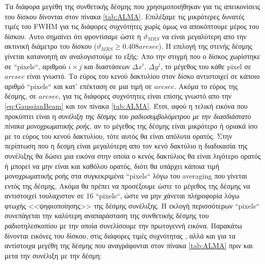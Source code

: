 Τα διάφορα μεγέθη της συνθετικής δέσμης που χρησιμοποιήθηκαν για τις απεικονίσεις του δίσκου δίνονται στον πίνακα \ref{tab:ALMA}. Επιλέξαμε τις μικρότερες δυνατές τιμές του {\en FWHM} για τις διάφορες συχνότητες χωρίς όμως να αποκόπτουμε μέρος του δίσκου. Αυτο σημαίνει ότι φροντίσαμε ώστε η $\vartheta_{MRS}$ να είναι μεγαλύτερη απο την ακτινική διάμετρο του δίσκου ($\vartheta_{MRS}\geq0.408 arcsec$). Η επιλογή της στενής δέσμης γίνεται κατανοητή αν αναλογιστούμε το εξής: Απο την στιγμή που ο δίσκος χωρίστηκε σε {\en ``pixels``}, αριθμού $i \times j$ και διαστάσεων $\Delta x^i$, $\Delta y^j$, το μέγεθος του κάθε {\en pixel} σε $arcsec$ είναι γνωστό. Το εύρος του κενού δακτυλίου στον δίσκο αντιστοιχεί σε κάποιο αριθμό {\en ``pixels``} και κατ' επέκταση σε μια τιμή σε $arcsec$. Ακόμα το εύρος της δέσμης, σε $arcsec$, για τις διάφορες συχνότητες είναι επίσης γνωστό απο την \eqref{eq:GaussianBeam} και τον πίνακα \ref{tab:ALMA}. Έτσι, αφού η τελική εικόνα που προκύπτει είναι η {\it συνέλιξη της δέσμης του ραδιοσυμβολόμετρου με την διασδιάστατο πίνακα μονοχρωματικής ροής}, αν το μέγεθος της δέσμης είναι μικρότερο ή οριακά ίσο με το εύρος του κενού δακτυλίου, τότε αυτός θα είναι απόλυτα ορατός. Στην περίπτωση που η δεσμη είναι μεγαλύτερη απο τον κενό δακτύλιο η διαδικασία της συνέλιξης θα δώσει μια εικόνα στην οποία ο κενός δακτύλιος θα είναι λιγότερο ορατός ή μπορεί να μην είναι και καθόλου ορατός, διότι θα υπάρχει κάποια τιμή μονοχρωματικής ροής στα συγκεκριμένα {\en ``pixels``} λόγω του {\en averaging} που γίνεται εντός της δέσμης. Ακόμα θα πρέπει να προσέξουμε ώστε το μέγεθος της δέσμης να αντιστοιχεί τουλαχιστον σε 16 {\en ``pixels``}, ώστε να μην χάνεται πληροφορία λόγω φτωχής <<ψηφιοποίησης>> της δέσμης συνέλιξης. Η εκλογή περισσότερων {\en ``pixels``} συνεπάγεται την καλύτερη αναπαράσταση της συνθετικής δέσμης του ραδιοτηλεσκοπίου με την οποία συνελίσουμε την πρωτογεννή εικόνα. Παρακάτω δίνονται εικόνες του δίσκου, στις διάφορες τιμές συχνότητας , αλλά και για τα αντίστοιχα μεγέθη της δέσμης που αναγράφονται στον πίνακα \ref{tab:ALMA} πριν και μετα την συνέλιξη με την δέσμη:

